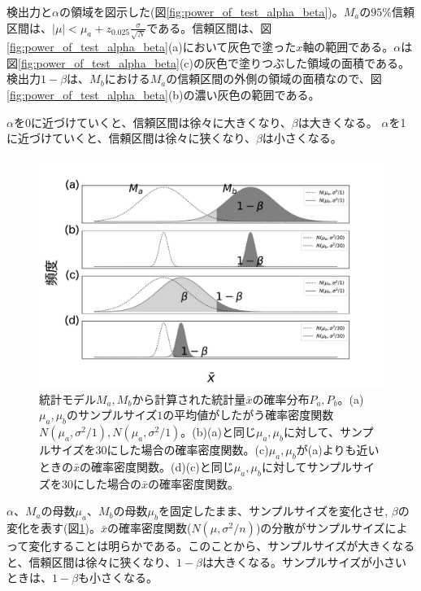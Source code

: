 検出力と$\alpha$の領域を図示した(図\ref{fig:power_of_test_alpha_beta})。$M_a$の$95\%$信頼区間は、$|\mu|<\mu_a+z_{0.025}\frac{\sigma}{\sqrt{N}}$である。信頼区間は、図\ref{fig:power_of_test_alpha_beta}(a)において灰色で塗った$x$軸の範囲である。$\alpha$は図\ref{fig:power_of_test_alpha_beta}(c)の灰色で塗りつぶした領域の面積である。
検出力$1-\beta$は、$M_b$における$M_a$の信頼区間の外側の領域の面積なので、図\ref{fig:power_of_test_alpha_beta}(b)の濃い灰色の範囲である。

$\alpha$を0に近づけていくと、信頼区間は徐々に大きくなり、$\beta$は大きくなる。
$\alpha$を1に近づけていくと、信頼区間は徐々に狭くなり、$\beta$は小さくなる。



\begin{figure}
    \begin{center}
        \includegraphics[width=15cm]{./image/04_/power_of_a_test_3.pdf}
        \caption{統計モデル$M_a,M_b$から計算された統計量$\bar{x}$の確率分布$P_a,P_b$。(a)$\mu_a,\mu_b$のサンプルサイズ$1$の平均値がしたがう確率密度関数$N(\mu_a,\sigma^2/1),N(\mu_a,\sigma^2/1)$。(b)(a)と同じ$\mu_a,\mu_b$に対して、サンプルサイズを$30$にした場合の確率密度関数。(c)$\mu_a,\mu_b$が(a)よりも近いときの$\bar{x}$の確率密度関数。(d)(c)と同じ$\mu_a,\mu_b$に対してサンプルサイズを$30$にした場合の$\bar{x}$の確率密度関数。}
        \label{fig:power_of_test_alpha_beta_sample_size}
    \end{center}
    \end{figure}

    

$\alpha$、$M_a$の母数$\mu_a$、$M_b$の母数$\mu_b$を固定したまま、サンプルサイズを変化させ,
$\beta$の変化を表す(図\ref{fig:power_of_test_alpha_beta_sample_size})。$\bar{x}$の確率密度関数($N(\mu,\sigma^2/n)$)の分散がサンプルサイズによって変化することは明らかである。このことから、サンプルサイズが大きくなると、信頼区間は徐々に狭くなり、$1-\beta$は大きくなる。サンプルサイズが小さいときは、$1-\beta$も小さくなる。

